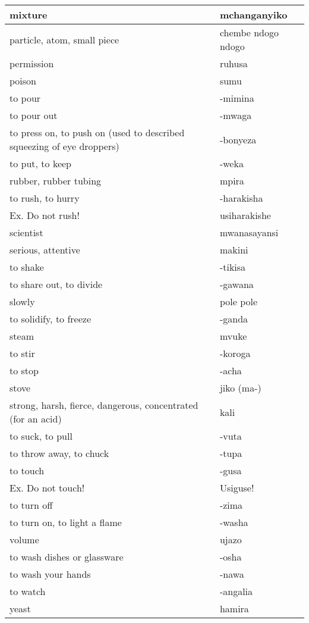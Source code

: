 \begin{center}
\begin{longtable}{|p{7cm}|p{7cm}|}
mixture	&	mchanganyiko	\\	\hline
particle, atom, small piece	&	chembe ndogo ndogo	\\	\hline
permission	&	ruhusa	\\	\hline
poison	&	sumu	\\	\hline
to pour	&	-mimina	\\	\hline
to pour out	&	-mwaga	\\	\hline
to press on, to push on (used to described squeezing of eye droppers)	&	-bonyeza	\\	\hline
to put, to keep	&	-weka	\\	\hline
rubber, rubber tubing	&	mpira	\\	\hline
to rush, to hurry	&	-harakisha 	\\	
        Ex. Do not rush!	&	        usiharakishe	\\	\hline
scientist	&	mwanasayansi	\\	\hline
serious, attentive	&	makini	\\	\hline
to shake	&	-tikisa	\\	\hline
to share out, to divide	&	-gawana	\\	\hline
slowly	&	pole pole	\\	\hline
to solidify, to freeze	&	-ganda	\\	\hline
steam	&	mvuke	\\	\hline
to stir	&	-koroga	\\	\hline
to stop	&	-acha	\\	\hline
stove	&	jiko (ma-)	\\	\hline
strong, harsh, fierce, dangerous, concentrated (for an acid)	&	kali	\\	\hline
to suck, to pull	&	-vuta	\\	\hline
to throw away, to chuck	&	-tupa	\\	\hline
to touch 	&	-gusa	\\	
        Ex. Do not touch!	&	        Usiguse!	\\	\hline
to turn off	&	-zima	\\	\hline
to turn on, to light a flame	&	-washa 	\\	\hline
volume	&	ujazo	\\	\hline
to wash dishes or glassware	&	-osha	\\	\hline
to wash your hands	&	-nawa	\\	\hline
to watch	&	-angalia	\\	\hline
yeast	&	hamira	\\	\hline




\end{longtable}
\end{center}